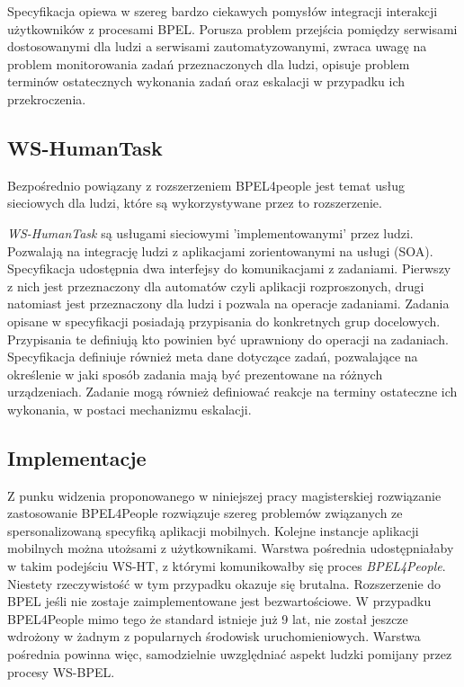 Specyfikacja opiewa w szereg bardzo ciekawych pomysłów integracji interakcji użytkowników z  procesami BPEL. Porusza problem przejścia pomiędzy serwisami dostosowanymi dla ludzi a serwisami zautomatyzowanymi, zwraca uwagę na  problem monitorowania zadań przeznaczonych dla ludzi, opisuje problem terminów ostatecznych wykonania zadań oraz eskalacji w przypadku ich przekroczenia.\cite[str. 6]{bpel4People}

\subsection{WS-HumanTask}

Bezpośrednio powiązany  z rozszerzeniem BPEL4people jest temat usług sieciowych dla ludzi, które są wykorzystywane przez to rozszerzenie.

\textit{WS-HumanTask} są usługami sieciowymi 'implementowanymi' przez ludzi. Pozwalają na integrację ludzi z aplikacjami zorientowanymi na usługi (SOA). Specyfikacja udostępnia dwa interfejsy do komunikacjami z zadaniami. Pierwszy z nich jest przeznaczony dla automatów czyli aplikacji rozproszonych, drugi natomiast jest przeznaczony dla ludzi i pozwala na operacje zadaniami.  
Zadania opisane w specyfikacji posiadają przypisania do konkretnych grup docelowych. Przypisania te definiują kto powinien być uprawniony do operacji na zadaniach. Specyfikacja definiuje również meta dane dotyczące zadań, pozwalające na określenie w jaki sposób zadania mają być prezentowane na różnych urządzeniach. Zadanie mogą również definiować reakcje na terminy ostateczne ich wykonania, w postaci mechanizmu eskalacji. 

\subsection{Implementacje}

Z punku widzenia proponowanego w niniejszej pracy magisterskiej rozwiązanie zastosowanie BPEL4People rozwiązuje szereg problemów związanych ze spersonalizowaną specyfiką aplikacji mobilnych. Kolejne instancje aplikacji mobilnych można utożsami z użytkownikami. Warstwa pośrednia udostępniałaby w takim podejściu WS-HT, z którymi komunikowałby się proces \textit{BPEL4People}. Niestety rzeczywistość w tym przypadku okazuje się brutalna. Rozszerzenie do BPEL jeśli nie zostaje zaimplementowane jest bezwartościowe. W przypadku BPEL4People mimo tego że standard istnieje już 9 lat, nie został jeszcze wdrożony w żadnym z popularnych środowisk uruchomieniowych.  
Warstwa pośrednia powinna więc, samodzielnie uwzględniać aspekt ludzki pomijany przez procesy WS-BPEL. 

